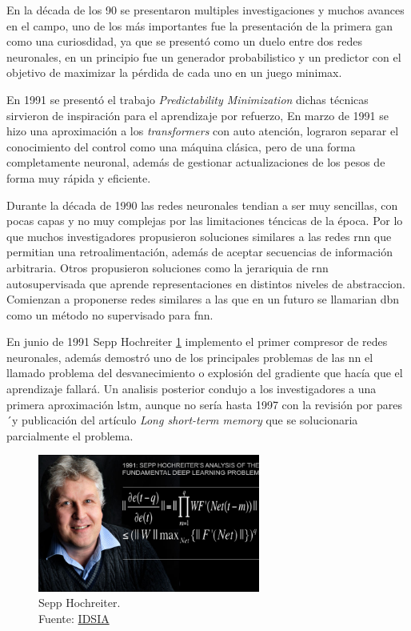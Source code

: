En la década de los 90 se presentaron multiples investigaciones y muchos avances en el campo, uno de los más importantes fue la presentación de la primera \acrshort{gan} como una curiosdidad, ya que se presentó como un duelo entre dos redes neuronales, en un principio fue un generador probabilistico y un predictor con el objetivo de maximizar la pérdida de cada uno en un juego minimax.

En 1991 se presentó el trabajo \textit{Predictability Minimization} \cite{urgen1991learning} dichas técnicas sirvieron de inspiración para el aprendizaje por refuerzo,
En marzo de 1991 se hizo una aproximación a los \textit{transformers} con auto atención, lograron separar el conocimiento del control como una máquina clásica, pero de una forma completamente neuronal, además de gestionar actualizaciones de los pesos de forma muy rápida y eficiente.

Durante la década de 1990 las redes neuronales tendian a ser muy sencillas, con pocas capas y no muy complejas por las limitaciones téncicas de la época.
Por lo que muchos investigadores propusieron soluciones similares a las redes \acrshort{rnn} que permitian una retroalimentación, además de aceptar secuencias de información arbitraria.
Otros propusieron soluciones como la jerariquia de \acrshort{rnn} autosupervisada que aprende representaciones en distintos niveles de abstraccion.
Comienzan a proponerse redes similares a las que en un futuro se llamarian \acrshort{dbn} como un método no supervisado para \acrshort{fnn}.

En junio de 1991 {Sepp Hochreiter} \ref{fig:sepp-hochreiter} implemento el primer compresor de redes neuronales, además demostró uno de los principales problemas de las \acrshort{nn} el llamado problema del desvanecimiento o explosión del gradiente que hacía que el aprendizaje fallará.
Un analisis posterior condujo a los investigadores a una primera aproximación \acrshort{lstm}, aunque no sería hasta 1997 con la revisión por pares´y publicación del artículo \textit{Long short-term memory} \cite{hochreiter1997long} que se solucionaria parcialmente el problema.

\begin{figure}[H]
  \centering
  \includegraphics[width=0.65\textwidth]{figures/Sepp Hochreiter.jpg}
  \caption{Sepp Hochreiter. \\Fuente: \href{https://people.idsia.ch/~juergen/fundamentaldeeplearningproblem.html}{IDSIA}}
  \label{fig:sepp-hochreiter}
\end{figure}

